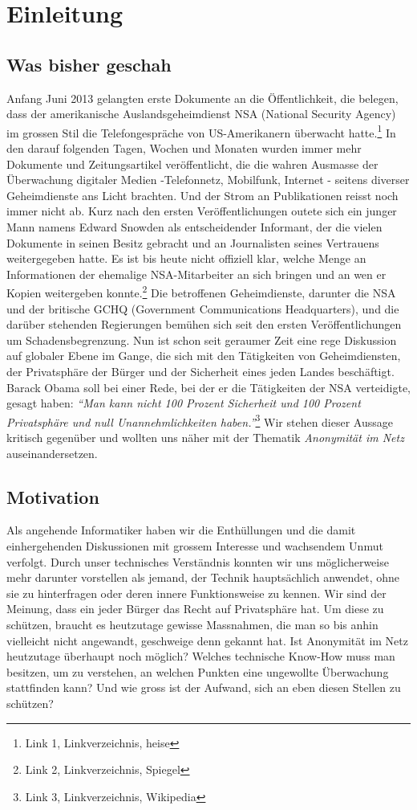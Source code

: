 \section{Einleitung}

\subsection{Was bisher geschah}
Anfang Juni 2013 gelangten erste Dokumente an die Öffentlichkeit, die belegen, dass der amerikanische Auslandsgeheimdienst NSA (National Security Agency) im grossen Stil die Telefongespräche von US-Amerikanern überwacht hatte.\footnote{Link 1, Linkverzeichnis, heise}
In den darauf folgenden Tagen, Wochen und Monaten wurden immer mehr Dokumente und Zeitungsartikel veröffentlicht, die die wahren Ausmasse der Überwachung digitaler Medien -Telefonnetz, Mobilfunk, Internet - seitens diverser Geheimdienste ans Licht brachten. Und der Strom an Publikationen reisst noch immer nicht ab. Kurz nach den ersten Veröffentlichungen outete sich ein junger Mann namens Edward Snowden als entscheidender Informant, der die vielen Dokumente in seinen Besitz gebracht und an Journalisten seines Vertrauens weitergegeben hatte. Es ist bis heute nicht offiziell klar, welche Menge an Informationen der ehemalige NSA-Mitarbeiter an sich bringen und an wen er Kopien weitergeben konnte.\footnote{Link 2, Linkverzeichnis, Spiegel}
Die betroffenen Geheimdienste, darunter die NSA und der britische GCHQ (Government Communications Headquarters), und die darüber stehenden Regierungen bemühen sich seit den ersten Veröffentlichungen um Schadensbegrenzung. Nun ist schon seit geraumer Zeit eine rege Diskussion auf globaler Ebene im Gange, die sich mit den Tätigkeiten von Geheimdiensten, der Privatsphäre der Bürger und der Sicherheit eines jeden Landes beschäftigt. Barack Obama soll bei einer Rede, bei der er die Tätigkeiten der NSA verteidigte, gesagt haben: \textit{``Man kann nicht 100 Prozent Sicherheit und 100 Prozent Privatsphäre und null Unannehmlichkeiten haben.''}\footnote{Link 3, Linkverzeichnis, Wikipedia}
Wir stehen dieser Aussage kritisch gegenüber und wollten uns näher mit der Thematik \textit{Anonymität im Netz} auseinandersetzen.

\subsection{Motivation}
Als angehende Informatiker haben wir die Enthüllungen und die damit einhergehenden Diskussionen mit grossem Interesse und wachsendem Unmut verfolgt. Durch unser technisches Verständnis konnten wir uns möglicherweise mehr darunter vorstellen als jemand, der Technik hauptsächlich anwendet, ohne sie zu hinterfragen oder deren innere Funktionsweise zu kennen. Wir sind der Meinung, dass ein jeder Bürger das Recht auf Privatsphäre hat. Um diese zu schützen, braucht es heutzutage gewisse Massnahmen, die man so bis anhin vielleicht nicht angewandt, geschweige denn gekannt hat. Ist Anonymität im Netz heutzutage überhaupt noch möglich? Welches technische Know-How muss man besitzen, um zu verstehen, an welchen Punkten eine ungewollte Überwachung stattfinden kann? Und wie gross ist der Aufwand, sich an eben diesen Stellen zu schützen?

